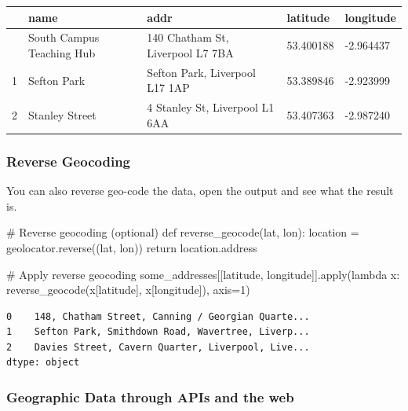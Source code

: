 \documentclass[
  letterpaper,
  DIV=11,
  numbers=noendperiod]{scrreprt}
\newenvironment{Shaded}{\begin{snugshade}}{\end{snugshade}}
\newcommand{\BuiltInTok}[1]{\textcolor[rgb]{0.00,0.23,0.31}{#1}}
\newcommand{\CommentTok}[1]{\textcolor[rgb]{0.37,0.37,0.37}{#1}}
\newcommand{\ControlFlowTok}[1]{\textcolor[rgb]{0.00,0.23,0.31}{#1}}
\newcommand{\DecValTok}[1]{\textcolor[rgb]{0.68,0.00,0.00}{#1}}
\newcommand{\KeywordTok}[1]{\textcolor[rgb]{0.00,0.23,0.31}{#1}}
\newcommand{\NormalTok}[1]{\textcolor[rgb]{0.00,0.23,0.31}{#1}}
\newcommand{\OperatorTok}[1]{\textcolor[rgb]{0.37,0.37,0.37}{#1}}
\newcommand{\StringTok}[1]{\textcolor[rgb]{0.13,0.47,0.30}{#1}}
\begin{document}
\begin{longtable}[]{@{}lllll@{}}
\toprule\noalign{}
& name & addr & latitude & longitude \\
\midrule\noalign{}
\endhead
\bottomrule\noalign{}
\endlastfoot
0 & South Campus Teaching Hub & 140 Chatham St, Liverpool L7 7BA &
53.400188 & -2.964437 \\
1 & Sefton Park & Sefton Park, Liverpool L17 1AP & 53.389846 &
-2.923999 \\
2 & Stanley Street & 4 Stanley St, Liverpool L1 6AA & 53.407363 &
-2.987240 \\
\end{longtable}

\subsubsection{Reverse Geocoding}\label{reverse-geocoding}

You can also reverse geo-code the data, open the output and see what the
result is.

\begin{Shaded}
\begin{Highlighting}[]
\CommentTok{\# Reverse geocoding (optional)}
\KeywordTok{def}\NormalTok{ reverse\_geocode(lat, lon):}
\NormalTok{    location }\OperatorTok{=}\NormalTok{ geolocator.reverse((lat, lon))}
    \ControlFlowTok{return}\NormalTok{ location.address}

\CommentTok{\# Apply reverse geocoding}
\NormalTok{some\_addresses[[}\StringTok{\textquotesingle{}latitude\textquotesingle{}}\NormalTok{, }\StringTok{\textquotesingle{}longitude\textquotesingle{}}\NormalTok{]].}\BuiltInTok{apply}\NormalTok{(}\KeywordTok{lambda}\NormalTok{ x: reverse\_geocode(x[}\StringTok{\textquotesingle{}latitude\textquotesingle{}}\NormalTok{], x[}\StringTok{\textquotesingle{}longitude\textquotesingle{}}\NormalTok{]), axis}\OperatorTok{=}\DecValTok{1}\NormalTok{)}
\end{Highlighting}
\end{Shaded}

\begin{verbatim}
0    148, Chatham Street, Canning / Georgian Quarte...
1    Sefton Park, Smithdown Road, Wavertree, Liverp...
2    Davies Street, Cavern Quarter, Liverpool, Live...
dtype: object
\end{verbatim}

\subsubsection{Geographic Data through APIs and the
web}\label{geographic-data-through-apis-and-the-web}
\end{document}
